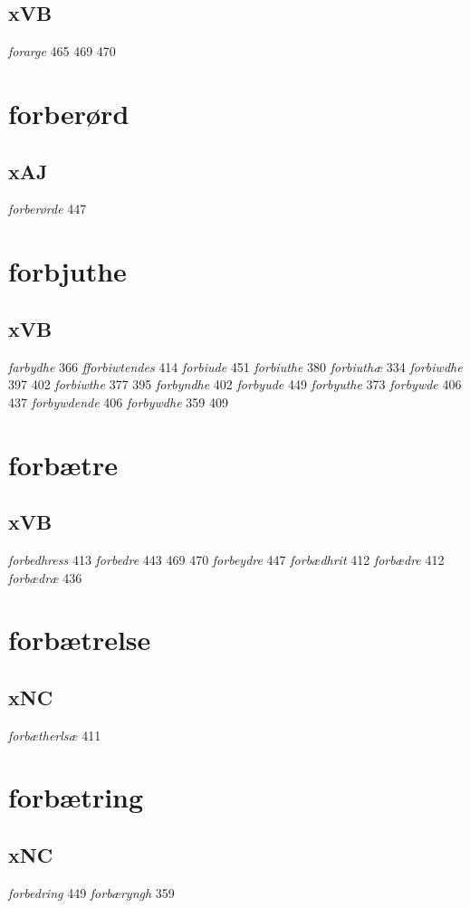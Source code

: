 \documentclass[a4paper,twocolumn]{article}
\begin{document}
\subsection{xVB}
\label{sec:orgde8c1e9}
\emph{forarge} 465 469 470 
\section{forberørd}
\label{sec:org1284b06}
\subsection{xAJ}
\label{sec:orgb0692f9}
\emph{forberørde} 447 
\section{forbjuthe}
\label{sec:org3c074e8}
\subsection{xVB}
\label{sec:orgea4dd2b}
\emph{farbydhe} 366 \emph{fforbiwtendes} 414 \emph{forbiude} 451 \emph{forbiuthe} 380 \emph{forbiuthæ} 334 \emph{forbiwdhe} 397 402 \emph{forbiwthe} 377 395 \emph{forbyndhe} 402 \emph{forbyude} 449 \emph{forbyuthe} 373 \emph{forbywde} 406 437 \emph{forbywdende} 406 \emph{forbywdhe} 359 409 
\section{forbætre}
\label{sec:org1740642}
\subsection{xVB}
\label{sec:orgaa72561}
\emph{forbedhress} 413 \emph{forbedre} 443 469 470 \emph{forbeydre} 447 \emph{forbædhrit} 412 \emph{forbædre} 412 \emph{forbædræ} 436 
\section{forbætrelse}
\label{sec:orgb40591c}
\subsection{xNC}
\label{sec:org9da8b51}
\emph{forbætherlsæ} 411 
\section{forbætring}
\label{sec:org3516cd2}
\subsection{xNC}
\label{sec:org1788581}
\emph{forbedring} 449 \emph{forbæryngh} 359 
\end{document}
